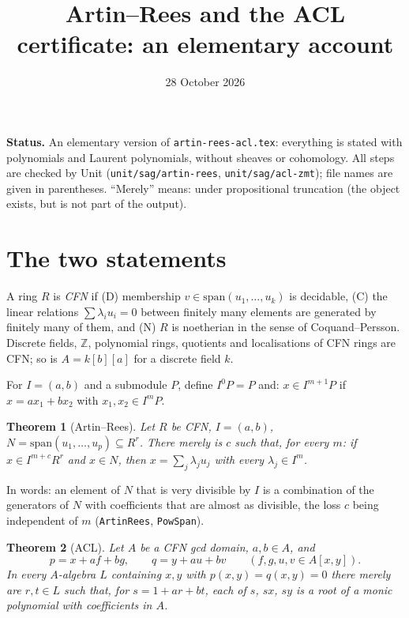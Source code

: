 \documentclass[11pt]{amsart}
\title{Artin--Rees and the ACL certificate: an elementary account}
\date{28 October 2026}
\newtheorem{theorem}{Theorem}
\theoremstyle{definition}
\theoremstyle{remark}
\newcommand{\sm}{\mathrm{span}}
\begin{document}
\maketitle

\noindent\textbf{Status.}
An elementary version of \texttt{artin-rees-acl.tex}: everything is
stated with polynomials and Laurent polynomials, without sheaves or
cohomology. All steps are checked by Unit (\texttt{unit/sag/artin-rees},
\texttt{unit/sag/acl-zmt}); file names are given in parentheses.
``Merely'' means: under propositional truncation (the object exists, but
is not part of the output).

\section{The two statements}

A ring $R$ is \emph{CFN} if (D) membership $v\in\sm(u_1,\dots,u_k)$ is
decidable, (C) the linear relations $\sum\lambda_iu_i=0$ between finitely
many elements are generated by finitely many of them, and (N) $R$ is
noetherian in the sense of Coquand--Persson. Discrete fields,
$\mathbb Z$, polynomial rings, quotients and localisations of CFN rings
are CFN; so is $A=k[b][a]$ for a discrete field $k$.

For $I=(a,b)$ and a submodule $P$, define $I^0P=P$ and: $x\in I^{m+1}P$
if $x=ax_1+bx_2$ with $x_1,x_2\in I^mP$.

\begin{theorem}[Artin--Rees]\label{thm:ar}
Let $R$ be CFN, $I=(a,b)$, $N=\sm(u_1,\dots,u_p)\subseteq R^r$. There
merely is $c$ such that, for every $m$: if $x\in I^{m+c}R^r$ and $x\in N$,
then $x=\sum_j\lambda_ju_j$ with every $\lambda_j\in I^m$.
\end{theorem}

In words: an element of $N$ that is very divisible by $I$ is a combination
of the generators of $N$ with coefficients that are almost as divisible,
the loss $c$ being independent of $m$
(\texttt{ArtinRees}, \texttt{PowSpan}).

\begin{theorem}[ACL]\label{thm:acl}
Let $A$ be a CFN gcd domain, $a,b\in A$, and
\[
 p=x+af+bg,\qquad q=y+au+bv\qquad(f,g,u,v\in A[x,y]).
\]
In every $A$-algebra $L$ containing $x,y$ with $p(x,y)=q(x,y)=0$ there
merely are $r,t\in L$ such that, for $s=1+ar+bt$, each of $s$, $sx$, $sy$
is a root of a monic polynomial with coefficients in $A$.
\end{theorem}
\end{document}
